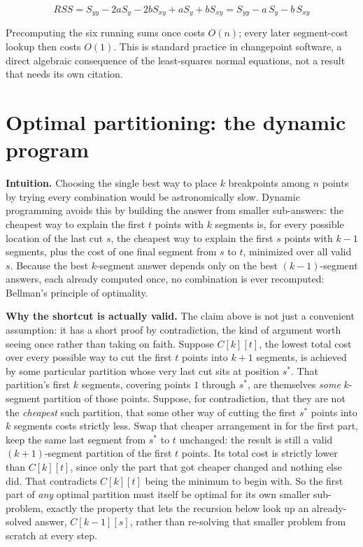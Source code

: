 \documentclass[11pt]{article}
\begin{document}
\begin{equation}
RSS = S_{yy} - 2aS_y - 2bS_{xy} + aS_y + bS_{xy} = S_{yy} - a\,S_y - b\,S_{xy}
\end{equation}

Precomputing the six running sums once costs $O(n)$; every later
segment-cost lookup then costs $O(1)$. This is standard practice in
changepoint software, a direct algebraic consequence of the least-squares
normal equations, not a result that needs its own citation.

\section{Optimal partitioning: the dynamic program}
\label{sec:dp}

\textbf{Intuition.} Choosing the single best way to place $k$ breakpoints
among $n$ points by trying every combination would be astronomically slow.
Dynamic programming avoids this by building the answer from smaller
sub-answers: the cheapest way to explain the first $t$ points with $k$
segments is, for every possible location of the last cut $s$, the cheapest
way to explain the first $s$ points with $k-1$ segments, plus the cost of
one final segment from $s$ to $t$, minimized over all valid $s$. Because the
best $k$-segment answer depends only on the best $(k-1)$-segment answers,
each already computed once, no combination is ever recomputed: Bellman's
principle of optimality.

\textbf{Why the shortcut is actually valid.} The claim above is not
just a convenient assumption: it has a short proof by contradiction,
the kind of argument worth seeing once rather than taking on faith.
Suppose $C[k][t]$, the lowest total cost over every possible way to
cut the first $t$ points into $k+1$ segments, is achieved by some
particular partition whose very last cut sits at position $s^\ast$.
That partition's first $k$ segments, covering points $1$ through
$s^\ast$, are themselves \emph{some} $k$-segment partition of those
points. Suppose, for contradiction, that they are not the
\emph{cheapest} such partition, that some other way of cutting the
first $s^\ast$ points into $k$ segments costs strictly less. Swap that
cheaper arrangement in for the first part, keep the same last segment
from $s^\ast$ to $t$ unchanged: the result is still a valid $(k+1)$-segment
partition of the first $t$ points. Its total cost is strictly lower
than $C[k][t]$, since only the part that got cheaper changed and
nothing else did. That contradicts $C[k][t]$ being the minimum to begin
with. So the first part of \emph{any} optimal partition must itself be
optimal for its own smaller sub-problem, exactly the property that lets
the recursion below look up an already-solved answer, $C[k-1][s]$,
rather than re-solving that smaller problem from scratch at every
step.
\end{document}
